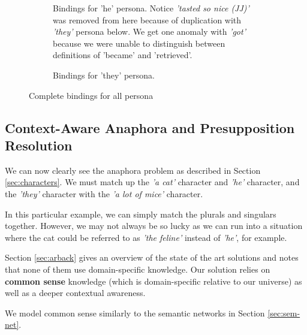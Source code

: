 \begin{figure}[h!]
\begin{subfigure}[t]{0.9\textwidth}
\begin{tikzpicture}[->, node distance=4.5cm,main node/.style={circle, draw, font=\sffamily\bfseries}]
        \end{tikzpicture}
    \caption{Bindings for 'he' persona. Notice \textit{'tasted so nice (JJ)'} was removed from here because of duplication with \textit{'they'} persona below. We get one anomaly with \textit{'got'} because we were unable to distinguish between definitions of 'became' and 'retrieved'.}
\end{subfigure}
\begin{subfigure}[t]{0.9\textwidth}
	\centering
    \caption{Bindings for 'they' persona.}
\end{subfigure}
\caption{Complete bindings for all persona}
\label{fig:all-binded}
\end{figure}

\subsection{Context-Aware Anaphora and Presupposition Resolution}
\label{sec:ar} \label{sec:common-sense}
We can now clearly see the anaphora problem as described in Section \ref{sec:characters}. We must match up the \textit{'a cat'} character and \textit{'he'} character, and the \textit{'they'} character with the \textit{'a lot of mice'} character. 

In this particular example, we can simply match the plurals and singulars together. However, we may not always be so lucky as we can run into a situation where the cat could be referred to as \textit{'the feline'} instead of \textit{'he'}, for example.

Section \ref{sec:arback} gives an overview of the state of the art solutions and notes that none of them use domain-specific knowledge. Our solution relies on \textbf{common sense} knowledge (which is domain-specific relative to our universe) as well as a deeper contextual awareness.

We model common sense similarly to the semantic networks in Section \ref{sec:sem-net}. 


